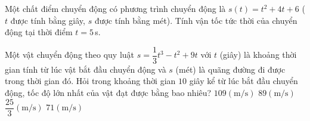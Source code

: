 \begin{ex}%
	Một chất điểm chuyển động có phương trình chuyển động là $s(t)=t^2+4t+6$ ($t$ được tính bằng giây, $s$ được tính bằng mét). Tính vận tốc tức thời của chuyển  động tại thời điểm $t=5$\,s.
\end{ex}

\begin{ex}%
	Một vật chuyển động theo quy luật $s=\dfrac{1}{3}t^3-t^2+9t$ với $t$ (giây) là khoảng thời gian tính từ lúc vật bắt đầu chuyển động và $s$ (mét) là quãng đường đi được trong thời gian đó. Hỏi trong khoảng thời gian $10$  giây kể từ lúc bắt đầu chuyển động, tốc độ lớn nhất của vật đạt được bằng bao nhiêu?
	\choice 
		 {$109\left(\mathrm{m/s}\right)$}
		 {\True $89\left(\mathrm{m/s}\right)$}
		{$\dfrac{25}{3}\left(\mathrm{m/s}\right)$} 
		{$71\left(\mathrm{m/s}\right)$} 
\end{ex}

